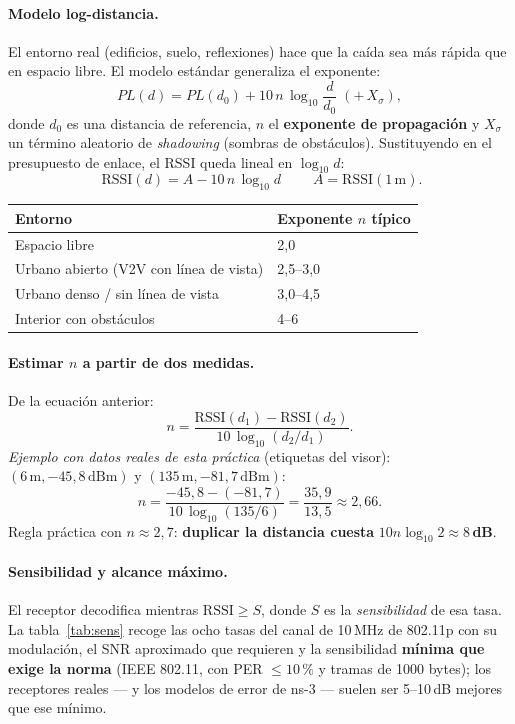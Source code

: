 \documentclass[11pt,a4paper]{article}
\begin{document}
\paragraph{Modelo log-distancia.} El entorno real (edificios, suelo,
reflexiones) hace que la caída sea más rápida que en espacio libre. El modelo
estándar generaliza el exponente:
\[ PL(d) = PL(d_0) + 10\,n\,\log_{10}\!\frac{d}{d_0} \;(+\,X_\sigma), \]
donde $d_0$ es una distancia de referencia, $n$ el \textbf{exponente de
propagación} y $X_\sigma$ un término aleatorio de \emph{shadowing}
(sombras de obstáculos). Sustituyendo en el presupuesto de enlace, el RSSI
queda lineal en $\log_{10} d$:
\[ \boxed{\;\mathrm{RSSI}(d) = A - 10\,n\,\log_{10} d\;}
   \qquad A = \mathrm{RSSI}(1\,\mathrm{m}). \]

\begin{center}
\small
\begin{tabular}{@{}ll@{}}
\toprule
\textbf{Entorno} & \textbf{Exponente $n$ típico} \\
\midrule
Espacio libre & 2{,}0 \\
Urbano abierto (V2V con línea de vista) & 2{,}5--3{,}0 \\
Urbano denso / sin línea de vista & 3{,}0--4{,}5 \\
Interior con obstáculos & 4--6 \\
\bottomrule
\end{tabular}
\end{center}

\paragraph{Estimar $n$ a partir de dos medidas.} De la ecuación anterior:
\[ n = \frac{\mathrm{RSSI}(d_1)-\mathrm{RSSI}(d_2)}
            {10\,\log_{10}(d_2/d_1)}. \]
\emph{Ejemplo con datos reales de esta práctica} (etiquetas del visor):
$(6\,\mathrm{m}, -45{,}8\,\mathrm{dBm})$ y
$(135\,\mathrm{m}, -81{,}7\,\mathrm{dBm})$:
\[ n = \frac{-45{,}8-(-81{,}7)}{10\,\log_{10}(135/6)}
     = \frac{35{,}9}{13{,}5} \approx 2{,}66. \]
Regla práctica con $n\approx2{,}7$: \textbf{duplicar la distancia cuesta}
$10n\log_{10}2 \approx 8$\,\textbf{dB}.

\paragraph{Sensibilidad y alcance máximo.} El receptor decodifica mientras
$\mathrm{RSSI} \geq S$, donde $S$ es la \emph{sensibilidad} de esa tasa. La
tabla~\ref{tab:sens} recoge las ocho tasas del canal de 10\,MHz de 802.11p
con su modulación, el SNR aproximado que requieren y la sensibilidad
\textbf{mínima que exige la norma} (IEEE 802.11, con PER $\leq 10\,\%$ y
tramas de 1000 bytes); los receptores reales --- y los modelos de error de
ns-3 --- suelen ser 5--10\,dB mejores que ese mínimo.
\end{document}

